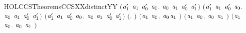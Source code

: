 \begin{SaveVerbatim}{HOLCCSTheoremsCCSXXdistinctYY}
   \ensuremath{(}\HOLSymConst{\HOLTokenForall{}}\ensuremath{\HOLBoundVar{a}\sb{\mathrm{1}}\sp{\prime{}}} \ensuremath{\HOLBoundVar{a}\sb{\mathrm{1}}} \ensuremath{\HOLBoundVar{a}\sb{\mathrm{0}}\sp{\prime{}}} \ensuremath{\HOLBoundVar{a}\sb{\mathrm{0}}}.  \ensuremath{\HOLBoundVar{a}\sb{\mathrm{0}}} \ensuremath{\HOLBoundVar{a}\sb{\mathrm{1}}} \HOLSymConst{\HOLTokenNotEqual{}}  \ensuremath{\HOLBoundVar{a}\sb{\mathrm{0}}\sp{\prime{}}} \ensuremath{\HOLBoundVar{a}\sb{\mathrm{1}}\sp{\prime{}}}\ensuremath{)} \HOLSymConst{\HOLTokenConj{}}
   \ensuremath{(}\HOLSymConst{\HOLTokenForall{}}\ensuremath{\HOLBoundVar{a}\sb{\mathrm{1}}\sp{\prime{}}} \ensuremath{\HOLBoundVar{a}\sb{\mathrm{1}}} \ensuremath{\HOLBoundVar{a}\sb{\mathrm{0}}\sp{\prime{}}} \ensuremath{\HOLBoundVar{a}\sb{\mathrm{0}}}.  \ensuremath{\HOLBoundVar{a}\sb{\mathrm{0}}} \ensuremath{\HOLBoundVar{a}\sb{\mathrm{1}}} \HOLSymConst{\HOLTokenNotEqual{}}  \ensuremath{\HOLBoundVar{a}\sb{\mathrm{0}}\sp{\prime{}}} \ensuremath{\HOLBoundVar{a}\sb{\mathrm{1}}\sp{\prime{}}}\ensuremath{)} \HOLSymConst{\HOLTokenConj{}}
   \ensuremath{(}\HOLSymConst{\HOLTokenForall{}}\ensuremath{\HOLBoundVar{a}\sb{\mathrm{1}}\sp{\prime{}}} \ensuremath{\HOLBoundVar{a}\sb{\mathrm{1}}} \ensuremath{\HOLBoundVar{a}\sb{\mathrm{0}}\sp{\prime{}}} \ensuremath{\HOLBoundVar{a}\sb{\mathrm{0}}}.  \ensuremath{\HOLBoundVar{a}\sb{\mathrm{0}}} \ensuremath{\HOLBoundVar{a}\sb{\mathrm{1}}} \HOLSymConst{\HOLTokenNotEqual{}}  \ensuremath{\HOLBoundVar{a}\sb{\mathrm{0}}\sp{\prime{}}} \ensuremath{\HOLBoundVar{a}\sb{\mathrm{1}}\sp{\prime{}}}\ensuremath{)} \HOLSymConst{\HOLTokenConj{}}
   \ensuremath{(}\HOLSymConst{\HOLTokenForall{}}.   \HOLSymConst{\HOLTokenNotEqual{}} \ensuremath{)} \HOLSymConst{\HOLTokenConj{}} \ensuremath{(}\HOLSymConst{\HOLTokenForall{}}\ensuremath{\HOLBoundVar{a}\sb{\mathrm{1}}} \ensuremath{\HOLBoundVar{a}\sb{\mathrm{0}}}. \ensuremath{\HOLBoundVar{a}\sb{\mathrm{0}}}\HOLSymConst{\ensuremath{\ldotp}}\ensuremath{\HOLBoundVar{a}\sb{\mathrm{1}}} \HOLSymConst{\HOLTokenNotEqual{}} \ensuremath{)} \HOLSymConst{\HOLTokenConj{}}
   \ensuremath{(}\HOLSymConst{\HOLTokenForall{}}\ensuremath{\HOLBoundVar{a}\sb{\mathrm{1}}} \ensuremath{\HOLBoundVar{a}\sb{\mathrm{0}}}. \ensuremath{\HOLBoundVar{a}\sb{\mathrm{0}}} \HOLSymConst{\ensuremath{+}} \ensuremath{\HOLBoundVar{a}\sb{\mathrm{1}}} \HOLSymConst{\HOLTokenNotEqual{}} \ensuremath{)} \HOLSymConst{\HOLTokenConj{}} \ensuremath{(}\HOLSymConst{\HOLTokenForall{}}\ensuremath{\HOLBoundVar{a}\sb{\mathrm{1}}} \ensuremath{\HOLBoundVar{a}\sb{\mathrm{0}}}. \ensuremath{\HOLBoundVar{a}\sb{\mathrm{0}}} \HOLSymConst{\ensuremath{\mid}} \ensuremath{\HOLBoundVar{a}\sb{\mathrm{1}}} \HOLSymConst{\HOLTokenNotEqual{}} \ensuremath{)} \HOLSymConst{\HOLTokenConj{}}

\end{SaveVerbatim}
